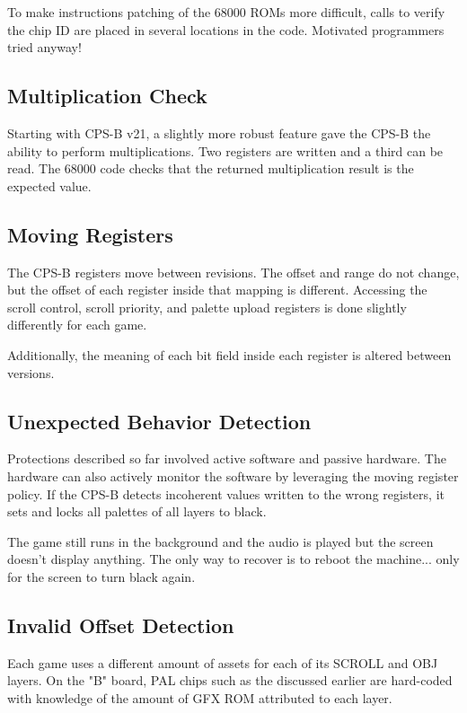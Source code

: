 To make instructions patching of the 68000 ROMs more difficult, calls to verify the chip ID are placed in several locations in the code. Motivated programmers tried anyway\cite{strider_conversion}!

\subsection{Multiplication Check}
Starting with CPS-B v21, a slightly more robust feature gave the CPS-B the ability to perform multiplications. Two registers are written and a third can be read. The 68000 code checks that the returned multiplication result is the expected value.

\subsection{Moving Registers}
The CPS-B registers move between revisions. The offset and range do not change, but the offset of each register inside that mapping is different. Accessing the scroll control, scroll priority, and palette upload registers is done slightly differently for each game.

Additionally, the meaning of each bit field inside each register is altered between versions.



\subsection{Unexpected Behavior Detection}
Protections described so far involved active software and passive hardware. The hardware can also actively monitor the software by leveraging the moving register policy. If the CPS-B detects incoherent values written to the wrong registers, it sets and locks all palettes of all layers to black. 

The game still runs in the background and the audio is played but the screen doesn't display anything. The only way to recover is to reboot the machine\cite{petitSecurity}... only for the screen to turn black again.






\subsection{Invalid Offset Detection}

Each game uses a different amount of assets for each of its SCROLL and OBJ layers. On the "B" board, PAL chips such as the  discussed earlier are hard-coded with knowledge of the amount of GFX ROM attributed to each layer.

